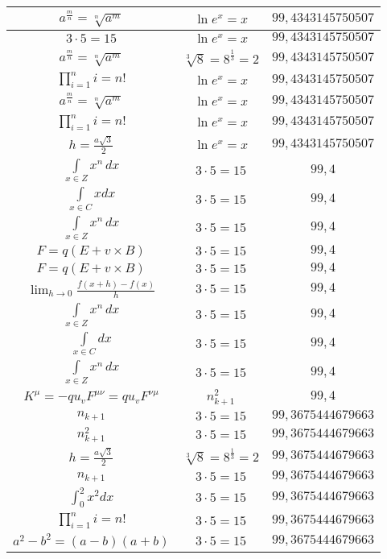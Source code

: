\documentclass{article}
\begin{document}
\begin{flushleft}
\begin{longtable}{|c|c|c|}
$a^{\frac{m}{n}}=\sqrt[n]{a^{m}}$ & $\ln e^x=x$ & $99,4343145750507$ \\ \hline 
$3\cdot 5=15$ & $\ln e^x=x$ & $99,4343145750507$ \\ \hline 
$a^{\frac{m}{n}}=\sqrt[n]{a^{m}}$ & $\sqrt[3]{8}=8^{\frac{1}{3}}=2$ & $99,4343145750507$ \\ \hline 
$\prod_{i=1}^ni=n!$ & $\ln e^x=x$ & $99,4343145750507$ \\ \hline 
$a^{\frac{m}{n}}=\sqrt[n]{a^{m}}$ & $\ln e^x=x$ & $99,4343145750507$ \\ \hline 
$\prod_{i=1}^ni=n!$ & $\ln e^x=x$ & $99,4343145750507$ \\ \hline 
$h=\frac{a\sqrt{3}}{2}$ & $\ln e^x=x$ & $99,4343145750507$ \\ \hline 
$\int \limits_{x\in Z}\!x^{n}\,dx$ & $3\cdot 5=15$ & $99,4$ \\ \hline 
$\int \limits_{x\in C}xdx$ & $3\cdot 5=15$ & $99,4$ \\ \hline 
$\int \limits_{x\in Z}\!x^{n}\,dx$ & $3\cdot 5=15$ & $99,4$ \\ \hline 
$F=q\left(E+v\times B\right)$ & $3\cdot 5=15$ & $99,4$ \\ \hline 
$F=q\left(E+v\times B\right)$ & $3\cdot 5=15$ & $99,4$ \\ \hline 
$\lim_{h\to0}\frac{f(x+h)-f(x)}{h}$ & $3\cdot 5=15$ & $99,4$ \\ \hline 
$\int \limits_{x\in Z}\!x^{n}\,dx$ & $3\cdot 5=15$ & $99,4$ \\ \hline 
$\int \limits_{x\in C}dx$ & $3\cdot 5=15$ & $99,4$ \\ \hline 
$\int \limits_{x\in Z}\!x^{n}\,dx$ & $3\cdot 5=15$ & $99,4$ \\ \hline 
$K^\mu=-qu_vF^{\mu\nu}=qu_vF^{\nu\mu}$ & $n_{k+1}^2$ & $99,4$ \\ \hline 
$n_{k+1}$ & $3\cdot 5=15$ & $99,3675444679663$ \\ \hline 
$n_{k+1}^2$ & $3\cdot 5=15$ & $99,3675444679663$ \\ \hline 
$h=\frac{a\sqrt{3}}{2}$ & $\sqrt[3]{8}=8^{\frac{1}{3}}=2$ & $99,3675444679663$ \\ \hline 
$n_{k+1}$ & $3\cdot 5=15$ & $99,3675444679663$ \\ \hline 
$\int _0^2x^2dx$ & $3\cdot 5=15$ & $99,3675444679663$ \\ \hline 
$\prod_{i=1}^ni=n!$ & $3\cdot 5=15$ & $99,3675444679663$ \\ \hline 
$a^2-b^2=(a-b)(a+b)$ & $3\cdot 5=15$ & $99,3675444679663$ \\ \hline 

\end{longtable}
\end{flushleft}
\end{document}
